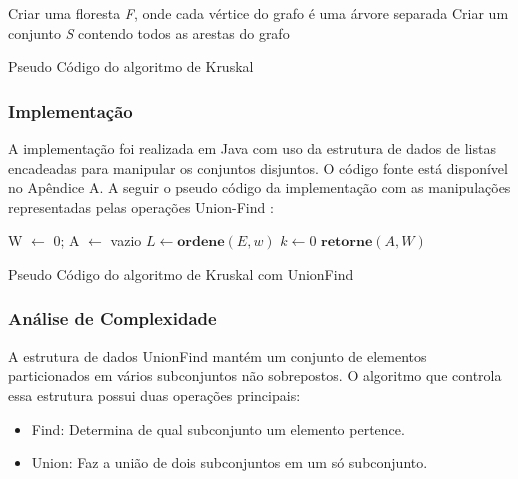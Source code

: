 \documentclass[a4paper,12pt]{article}
\begin{document}
\begin{algorithm}[H]
\SetAlgoLined
{}
Criar uma floresta \emph{F}, onde cada vértice do grafo é uma árvore separada\;
Criar um conjunto \emph{S} contendo todos as arestas do grafo\;
\caption{Pseudo Código do algoritmo de Kruskal}
\end{algorithm}

\subsubsection{Implementação}
A implementação foi realizada em Java com uso da estrutura de dados de listas encadeadas para manipular os conjuntos disjuntos. O código fonte está disponível no Apêndice A. A seguir o pseudo código da implementação com as manipulações representadas pelas operações Union-Find :\\
\begin{algorithm}[H]
\LinesNumbered
\SetAlgoLined
{}
W $\gets$ 0; A $\gets$ vazio\;
$L \gets \textbf{ordene}(E ,w )$\;
$k \gets 0$\;
$\textbf{retorne} (A, W)$\;
\caption{Pseudo Código do algoritmo de Kruskal com UnionFind}
\end{algorithm}

\subsubsection{Análise de Complexidade}
A estrutura de dados UnionFind mantém um conjunto de elementos particionados em vários subconjuntos não sobrepostos. O algoritmo que controla essa estrutura possui duas operações principais:
\begin{itemize}
\item Find: Determina de qual subconjunto um elemento pertence.
\item Union: Faz a união de dois subconjuntos em um só subconjunto.
\end{itemize}
\end{document}

